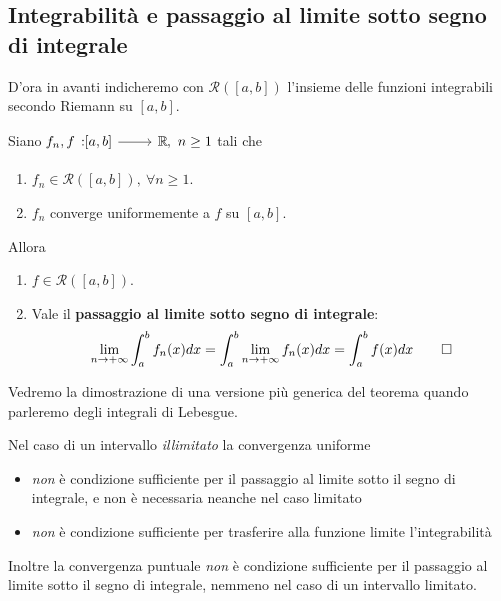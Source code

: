 \subsection{Integrabilità e passaggio al limite sotto segno di integrale}
D'ora in avanti indicheremo con $\mathcal{R}\left(\left[a,b\right]\right)$ l'insieme delle funzioni integrabili secondo Riemann su $[a,b]$.
\begin{theoremaqed}\label{passaggioallimitecontinuitàuniforme}
	Siano $\funz{f_n,f}{\left[a,b\right]}{\realset},\ n\geq 1$ tali che
	\begin{enumerate}[label=\alph*.]
		\item $f_n\in\mathcal{R}\left(\left[a,b\right]\right),\ \forall n\geq 1$.
		\item $f_n$ converge uniformemente a $f$ su $\left[a,b\right]$.
	\end{enumerate}
	Allora
	\begin{enumerate}
		\item $f\in\mathcal{R}\left(\left[a,b\right]\right)$.
		\item Vale il \textbf{passaggio al limite sotto segno di integrale}:
		\begin{equation}
			\lim_{n\to+\infty}\int_{a}^{b}f_n(x)dx=\int_{a}^{b}\lim_{n\to+\infty}f_n(x)dx=\int_{a}^{b}f(x)dx\qedhere
		\end{equation}
	\end{enumerate}
\end{theoremaqed}
Vedremo la dimostrazione di una versione più generica del teorema quando parleremo degli integrali di Lebesgue.
\begin{observe}
	Nel caso di un intervallo \textit{illimitato} la convergenza uniforme 
	\begin{itemize}
		\item \textit{non} è condizione sufficiente per il passaggio al limite sotto il segno di integrale, e non è necessaria neanche nel caso limitato
		\item \textit{non} è condizione sufficiente per trasferire alla funzione limite l'integrabilità
	\end{itemize}
	Inoltre la convergenza puntuale \textit{non} è condizione sufficiente per il passaggio al limite sotto il segno di integrale, nemmeno nel caso di un intervallo limitato.
\end{observe}
